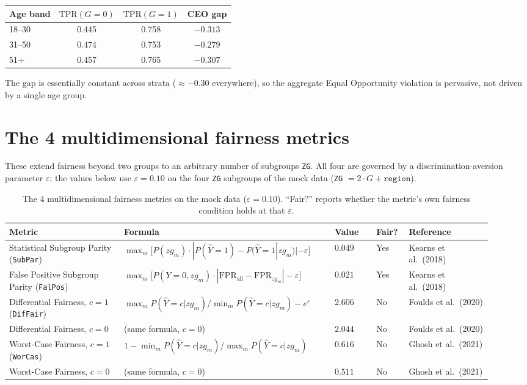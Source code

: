 \documentclass[11pt]{article}
\begin{document}
\begin{center}
\begin{tabular}{lccc}
\toprule
Age band & $\mathrm{TPR}(G{=}0)$ & $\mathrm{TPR}(G{=}1)$ & CEO gap \\
\midrule
18--30 & 0.445 & 0.758 & $-0.313$ \\
31--50 & 0.474 & 0.753 & $-0.279$ \\
51+    & 0.457 & 0.765 & $-0.307$ \\
\bottomrule
\end{tabular}
\end{center}

The gap is essentially constant across strata ($\approx -0.30$ everywhere),
so the aggregate Equal Opportunity violation is pervasive, not driven by a
single age group.

\section{The 4 multidimensional fairness metrics}

These extend fairness beyond two groups to an arbitrary number of subgroups
\texttt{ZG}. All four are governed by a discrimination-aversion parameter
$\varepsilon$; the values below use $\varepsilon = 0.10$ on the four
\texttt{ZG} subgroups of the mock data (\texttt{ZG} $=2\cdot G+\texttt{region}$).

\begin{table}[h]
\centering
\small
\begin{tabular}{p{0.22\linewidth}p{0.4\linewidth}p{0.08\linewidth}p{0.06\linewidth}p{0.16\linewidth}}
\toprule
Metric & Formula & Value & Fair? & Reference \\
\midrule
Statistical Subgroup Parity (\texttt{SubPar}) &
  $\max_m\big[P(zg_m)\cdot|P(\hat Y{=}1)-P(\hat Y{=}1|zg_m)|-\varepsilon\big]$ &
  $0.049$ & Yes & Kearns et al.\ (2018) \\
False Positive Subgroup Parity (\texttt{FalPos}) &
  $\max_m\big[P(Y{=}0,zg_m)\cdot|\mathrm{FPR}_{\text{all}}-\mathrm{FPR}_{zg_m}|-\varepsilon\big]$ &
  $0.021$ & Yes & Kearns et al.\ (2018) \\
Differential Fairness, $c=1$ (\texttt{DifFair}) &
  $\max_m P(\hat Y{=}c|zg_m)/\min_m P(\hat Y{=}c|zg_m)-e^{\varepsilon}$ &
  $2.606$ & No & Foulds et al.\ (2020) \\
Differential Fairness, $c=0$ &
  (same formula, $c=0$) &
  $2.044$ & No & Foulds et al.\ (2020) \\
Worst-Case Fairness, $c=1$ (\texttt{WorCas}) &
  $1-\min_m P(\hat Y{=}c|zg_m)/\max_m P(\hat Y{=}c|zg_m)$ &
  $0.616$ & No & Ghosh et al.\ (2021) \\
Worst-Case Fairness, $c=0$ &
  (same formula, $c=0$) &
  $0.511$ & No & Ghosh et al.\ (2021) \\
\bottomrule
\end{tabular}
\caption{The 4 multidimensional fairness metrics on the mock data ($\varepsilon = 0.10$). ``Fair?'' reports whether the metric's own fairness condition holds at that $\varepsilon$.}
\end{table}
\end{document}
